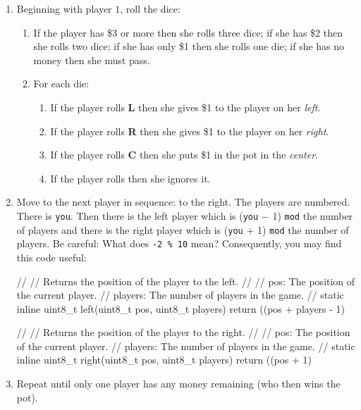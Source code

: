 \documentclass{article}
\begin{document}
\begin{enumerate}
\item
Beginning with player $1$, roll the dice:
\begin{enumerate}
\item
If the player has \$3 or more then she rolls three dice;
if she has \$2 then she rolls two dice;
if she has only \$1 then she rolls one die;
if she has no money then she must pass.

\item For each die:
\begin{enumerate}
\item If the player rolls \textbf{L} then she gives \$1 to the player on her \emph{left}.

\item If the player rolls \textbf{R} then she gives \$1 to the player on her \emph{right}.

\item If the player rolls \textbf{C} then she puts \$1 in the pot in the
    \emph{center}.

\item If the player rolls \textbf{\textbullet} then she ignores it.
\end{enumerate}

\end{enumerate}
\item Move to the next player in sequence: to the
right. The players are numbered. There is \texttt{you}. Then there
is the left player which is (\texttt{you} $-$ 1) \texttt{mod} the number
of players and there is the right player which is (\texttt{you} $+$
1) \texttt{mod} the number of players.
Be careful: What does \texttt{-2 \% 10} mean? Consequently, you may find this code useful:
\begin{codelisting}{}
//
// Returns the position of the player to the left.
//
// pos:     The position of the current player.
// players: The number of players in the game.
//
static inline uint8_t left(uint8_t pos, uint8_t players) {
  return ((pos + players - 1) %
}

//
// Returns the position of the player to the right.
//
// pos:     The position of the current player.
// players: The number of players in the game.
//
static inline uint8_t right(uint8_t pos, uint8_t players) {
  return ((pos + 1) %
}
\end{codelisting}

\item Repeat until only one player has any money remaining (who then wins the pot).
\end{enumerate}
\end{document}
